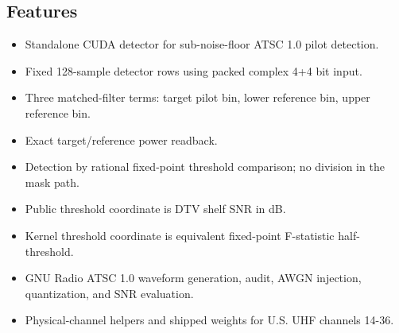 \documentclass[10pt,letterpaper]{article}
\newcommand{\code}[1]{\texttt{\detokenize{#1}}}
\begin{document}
\begin{minipage}[t]{0.48\textwidth}
\subsection*{Features}
\begin{itemize}
  \item Standalone CUDA detector for sub-noise-floor ATSC 1.0 pilot detection.
  \item Fixed 128-sample detector rows using packed complex 4+4 bit input.
  \item Three matched-filter terms: target pilot bin, lower reference bin, upper reference bin.
  \item Exact \code{uint64} target/reference power readback.
  \item Detection by rational fixed-point threshold comparison; no division in the mask path.
  \item Public threshold coordinate is DTV shelf SNR in dB.
  \item Kernel threshold coordinate is equivalent fixed-point F-statistic half-threshold.
  \item GNU Radio ATSC 1.0 waveform generation, audit, AWGN injection, quantization, and SNR evaluation.
  \item Physical-channel helpers and shipped weights for U.S. UHF channels 14-36.
\end{itemize}
\end{minipage}
\hfill
\end{document}
